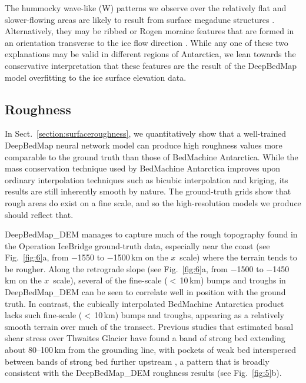 
The hummocky wave-like (W) patterns we observe over the relatively flat and slower-flowing areas are likely to result from surface megadune structures \citep{ScambosSnowMegadune2014}.
Alternatively, they may be ribbed or Rogen moraine features that are formed in an orientation transverse to the ice flow direction \citep{HattestrandRibbedmorainesSweden1997,HattestrandRibbedmoraineformation1999}.
While any one of these two explanations may be valid in different regions of Antarctica, we lean towards the conservative interpretation that these features are the result of the DeepBedMap model overfitting to the ice surface elevation data.

\subsection{Roughness}

In Sect.~\ref{section:surfaceroughness}, we quantitatively show that a well-trained DeepBedMap neural network model can produce high roughness values more comparable to the ground truth than those of BedMachine Antarctica.
While the mass conservation technique used by BedMachine Antarctica \citep{MorlighemDeepglacialtroughs2019} improves upon ordinary interpolation techniques such as bicubic interpolation and kriging, its results are still inherently smooth by nature.
The ground-truth grids show that rough areas do exist on a fine scale, and so the high-resolution models we produce should reflect that.

DeepBedMap\_DEM manages to capture much of the rough topography found in the Operation IceBridge ground-truth data, especially near the coast (see Fig.~\ref{fig:6}a, from $-$1550 to $-$1500\,\unit{km} on the $x$~scale) where the terrain tends to be rougher.
Along the retrograde slope (see Fig.~\ref{fig:6}a, from $-$1500 to $-$1450\,\unit{km} on the $x$~scale), several of the fine-scale ($<$\,10\,\unit{km}) bumps and troughs in DeepBedMap\_DEM can be seen to correlate well in position with the ground truth.
In contrast, the cubically interpolated BedMachine Antarctica product lacks such fine-scale ($<$\,10\,\unit{km}) bumps and troughs, appearing as a relatively smooth terrain over much of the transect.
Previous studies that estimated basal shear stress over Thwaites Glacier have found a band of strong bed extending about 80--100\,\unit{km} from the grounding line, with pockets of weak bed interspersed between bands of strong bed further upstream \citep{JoughinBasalconditionsPine2009,SergienkoRegularPatternsFrictional2013}, a pattern that is broadly consistent with the DeepBedMap\_DEM roughness results (see Fig.~\ref{fig:5}b).

